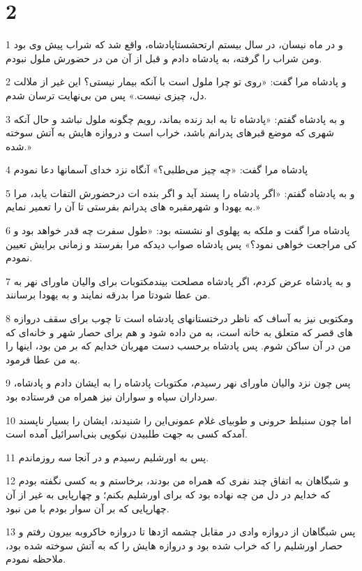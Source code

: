 \chapter{2}

\par 1 و در ماه نیسان، در سال بیستم ارتحشستاپادشاه، واقع شد که شراب پیش وی بود ومن شراب را گرفته، به پادشاه دادم و قبل از آن من در حضورش ملول نبودم.
\par 2 و پادشاه مرا گفت: «روی تو چرا ملول است با آنکه بیمار نیستی؟ این غیر از ملالت دل، چیزی نیست.» پس من بی‌نهایت ترسان شدم.
\par 3 و به پادشاه گفتم: «پادشاه تا به ابد زنده بماند، رویم چگونه ملول نباشد و حال آنکه شهری که موضع قبرهای پدرانم باشد، خراب است و دروازه هایش به آتش سوخته شده.»
\par 4 پادشاه مرا گفت: «چه چیز می‌طلبی؟» آنگاه نزد خدای آسمانها دعا نمودم
\par 5 و به پادشاه گفتم: «اگر پادشاه را پسند آید و اگر بنده ات درحضورش التفات یابد، مرا به یهودا و شهرمقبره های پدرانم بفرستی تا آن را تعمیر نمایم.»
\par 6 پادشاه مرا گفت و ملکه به پهلوی او نشسته بود: «طول سفرت چه قدر خواهد بود و کی مراجعت خواهی نمود؟» پس پادشاه صواب دیدکه مرا بفرستد و زمانی برایش تعیین نمودم.
\par 7 و به پادشاه عرض کردم، اگر پادشاه مصلحت بیندمکتوبات برای والیان ماورای نهر به من عطا شودتا مرا بدرقه نمایند و به یهودا برسانند.
\par 8 ومکتوبی نیز به آساف که ناظر درختستانهای پادشاه است تا چوب برای سقف دروازه های قصر که متعلق به خانه است، به من داده شود و هم برای حصار شهر و خانه‌ای که من در آن ساکن شوم. پس پادشاه برحسب دست مهربان خدایم که بر من بود، اینها را به من عطا فرمود.
\par 9 پس چون نزد والیان ماورای نهر رسیدم، مکتوبات پادشاه را به ایشان دادم و پادشاه، سرداران سپاه و سواران نیز همراه من فرستاده بود.
\par 10 اما چون سنبلط حرونی و طوبیای غلام عمونی‌این را شنیدند، ایشان را بسیار ناپسند آمدکه کسی به جهت طلبیدن نیکویی بنی‌اسرائیل آمده است.
\par 11 پس به اورشلیم رسیدم و در آنجا سه روزماندم.
\par 12 و شبگاهان به اتفاق چند نفری که همراه من بودند، برخاستم و به کسی نگفته بودم که خدایم در دل من چه نهاده بود که برای اورشلیم بکنم؛ و چهارپایی به غیر از آن چهارپایی که بر آن سوار بودم با من نبود.
\par 13 پس شبگاهان از دروازه وادی در مقابل چشمه اژدها تا دروازه خاکروبه بیرون رفتم و حصار اورشلیم را که خراب شده بود و دروازه هایش را که به آتش سوخته شده بود، ملاحظه نمودم.
